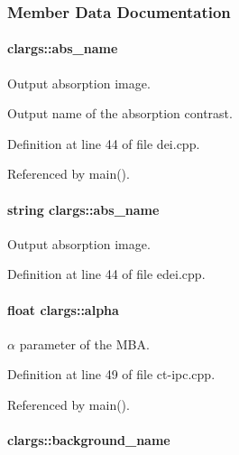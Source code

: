\subsubsection{Member Data Documentation}
\hypertarget{structclargs_acf708361110dcb43acb7c9cccdfd7f74}{
\paragraph[{abs\_\-name}]{ {\bf clargs::abs\_\-name}}\hfill}
\label{structclargs_acf708361110dcb43acb7c9cccdfd7f74}


Output absorption image. 

Output name of the absorption contrast. 

Definition at line 44 of file dei.cpp.



Referenced by main().

\hypertarget{structclargs_ae26e4b09db8c69aa2585f1d7e35233ec}{
\paragraph[{abs\_\-name}]{\setlength{\rightskip}{0pt plus 5cm}string {\bf clargs::abs\_\-name}}\hfill}
\label{structclargs_ae26e4b09db8c69aa2585f1d7e35233ec}


Output absorption image. 



Definition at line 44 of file edei.cpp.

\hypertarget{structclargs_a5e1a598ac662ec40790638ef40947e61}{
\paragraph[{alpha}]{\setlength{\rightskip}{0pt plus 5cm}float {\bf clargs::alpha}}\hfill}
\label{structclargs_a5e1a598ac662ec40790638ef40947e61}


$\alpha$ parameter of the MBA. 



Definition at line 49 of file ct-\/ipc.cpp.



Referenced by main().

\hypertarget{structclargs_a87826797d093707077f17f634316eb3e}{
\paragraph[{background\_\-name}]{ {\bf clargs::background\_\-name}}\hfill}
\label{structclargs_a87826797d093707077f17f634316eb3e}


